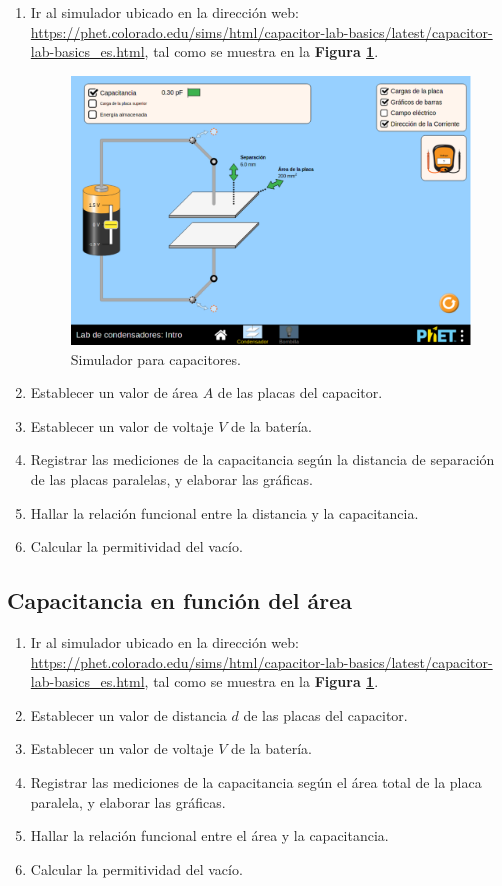 \documentclass[letter,11pt]{article}
\begin{document}
\begin{enumerate}
\item Ir al simulador ubicado en la dirección web:
    \url{https://phet.colorado.edu/sims/html/capacitor-lab-basics/latest/capacitor-lab-basics_es.html},
        tal como se muestra en la \textbf{Figura \ref{figura3}}.

\begin{figure}[!h]
\centering
\includegraphics[scale=0.45]{resources/f3.eps}
\caption{Simulador para capacitores.}
\label{figura3}
\end{figure}

\item Establecer un valor de área $A$ de las placas del capacitor.
\item Establecer un valor de voltaje $V$ de la batería.
\item Registrar las mediciones de la capacitancia según la distancia de
    separación de las placas paralelas, y elaborar las gráficas.
\item Hallar la relación funcional entre la distancia y la capacitancia.
\item Calcular la permitividad del vacío.
\end{enumerate}

\subsection{Capacitancia en función del área}

\begin{enumerate}
\item Ir al simulador ubicado en la dirección web:
    \url{https://phet.colorado.edu/sims/html/capacitor-lab-basics/latest/capacitor-lab-basics_es.html},
        tal como se muestra en la \textbf{Figura \ref{figura3}}.
\item Establecer un valor de distancia $d$ de las placas del capacitor.
\item Establecer un valor de voltaje $V$ de la batería.
\item Registrar las mediciones de la capacitancia según el área total de la
    placa paralela, y elaborar las gráficas.
\item Hallar la relación funcional entre el área y la capacitancia.
\item Calcular la permitividad del vacío.
\end{enumerate}
\end{document}
